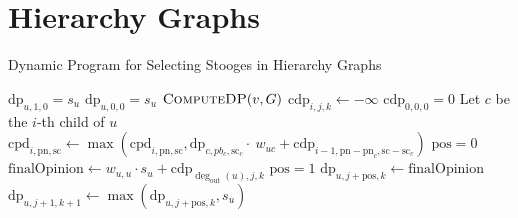 \section{Hierarchy Graphs} 
\label{sec:treedp}



\begin{algorithm}
\caption{Dynamic Program for Selecting Stooges in Hierarchy Graphs}\label{alg:algo1}
\begin{algorithmic}[1]
            \State $\mathrm{dp}_{u,1,0} = s_u$
        \Else
            \State $\mathrm{dp}_{u,0,0} = s_u$
        \EndIf
    \EndIf
        \State $\textsc{ComputeDP}(v, G)$
    \EndFor
    \State $\textrm{cdp}_{i,j,k} \leftarrow -\infty$
    \State $\textrm{cdp}_{0,0,0} = 0$
        \State Let $c$ be the $i$-th child of $u$
                        \State $\textrm{cpd}_{i, \mathrm{pn}, \mathrm{sc}} \leftarrow \max(\mathrm{cpd}_{i, \mathrm{pn}, \mathrm{sc}}, \mathrm{dp}_{c, pb_c, \mathrm{sc}_c} \cdot \ w_{uc} + \textrm{cdp}_{i-1, \mathrm{pn}-\mathrm{pn}_c, \mathrm{sc}-\mathrm{sc}_c})$
                    \EndFor
                \EndFor
            \EndFor
        \EndFor
    \EndFor
        \EndIf
        \State $\mathrm{pos} = 0$
        \State $\textrm{finalOpinion}\leftarrow w_{u,u} \cdot s_u + \textrm{cdp}_{\deg_{\mathrm{out}}(u), j, k}$
            \State $\mathrm{pos} = 1$
        \EndIf
        \State $\mathrm{dp}_{u,j+\mathrm{pos},k} \leftarrow \textrm{finalOpinion}$
        \State $\mathrm{dp}_{u,j+1,k+1} \leftarrow \max(\mathrm{dp}_{u,j+\mathrm{pos},k},\textrm{$s_u$})$
        \EndFor
    \EndFor
\EndFunction
\end{algorithmic}
\end{algorithm}

